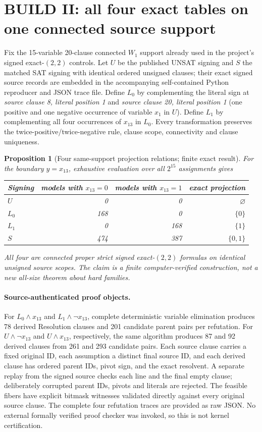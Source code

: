 \documentclass[11pt]{article}
\newtheorem{proposition}[theorem]{Proposition}
\begin{document}
\section{BUILD II: all four exact tables on one connected source support}
Fix the 15-variable 20-clause connected $W_1$ support already used in the project's signed exact-$(2,2)$ controls. Let $U$ be the published UNSAT signing and $S$ the matched SAT signing with identical ordered unsigned clauses; their exact signed source records are embedded in the accompanying self-contained Python reproducer and JSON trace file. Define $L_0$ by complementing the literal sign at \emph{source clause 8, literal position 1} and \emph{source clause 20, literal position 1} (one positive and one negative occurrence of variable $x_1$ in $U$). Define $L_1$ by complementing all four occurrences of $x_{13}$ in $L_0$. Every transformation preserves the twice-positive/twice-negative rule, clause scope, connectivity and clause uniqueness.

\begin{proposition}[Four same-support projection relations; finite exact result]\label{finite}
For the boundary $y=x_{13}$, exhaustive evaluation over all $2^{15}$ assignments gives
\begin{center}\begin{tabular}{lrrr}\toprule
Signing & models with $x_{13}=0$ & models with $x_{13}=1$ & exact projection\\\midrule
$U$ & 0 & 0 & $\varnothing$\\
$L_0$ & 168 & 0 & $\{0\}$\\
$L_1$ & 0 & 168 & $\{1\}$\\
$S$ & 474 & 387 & $\{0,1\}$\\\bottomrule
\end{tabular}\end{center}
All four are connected proper strict signed exact-$(2,2)$ formulas on \emph{identical unsigned source scopes}. The claim is a finite computer-verified construction, not a new all-size theorem about hard families.
\end{proposition}

\paragraph{Source-authenticated proof objects.} For $L_0\wedge x_{13}$ and $L_1\wedge\neg x_{13}$, complete deterministic variable elimination produces 78 derived Resolution clauses and 201 candidate parent pairs per refutation. For $U\wedge\neg x_{13}$ and $U\wedge x_{13}$, respectively, the same algorithm produces 87 and 92 derived clauses from 261 and 293 candidate pairs. Each source clause carries a fixed original ID, each assumption a distinct final source ID, and each derived clause has ordered parent IDs, pivot sign, and the exact resolvent. A separate replay from the signed source checks each line and the final empty clause; deliberately corrupted parent IDs, pivots and literals are rejected. The feasible fibers have explicit bitmask witnesses validated directly against every original source clause. The complete four refutation traces are provided as raw JSON. No external formally verified proof checker was invoked, so this is not kernel certification.
\end{document}
